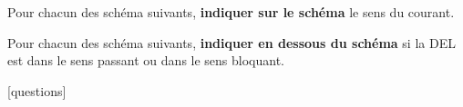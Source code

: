\documentclass[11pt]{exam}		%
\begin{document}
\begin{questions}
	\begin{figure*}[hb]
		\centering
			\hspace{180pt}
	\end{figure*}
		



	\question[4]
	Pour chacun des schéma suivants, \textbf{indiquer sur le schéma} le sens du courant.

	\begin{figure*}[hb]
		\centering
		\hspace{70pt}
			\hspace{20pt}
			\hspace{20pt}
			\hspace{20pt}
	\end{figure*}
		



	\question[2]
	Pour chacun des schéma suivants, \textbf{indiquer en dessous du schéma} 
	si la DEL est dans le sens passant ou dans le sens bloquant.

	\begin{figure*}[hb]
		\centering
			\hspace{180pt}
	\end{figure*}
		




\end{questions}


\vfill
\begin{center}
\setlength{\doublerulesep}{0.25in}
[questions]
\end{center}
\end{document}
